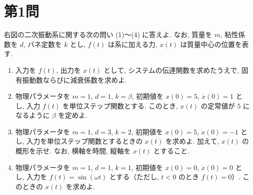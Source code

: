 
\section*{第1問}

右図の二次振動系に関する次の問い (1)〜(4) に答えよ. なお, 質量を $m$, 粘性係数を $d$,
バネ定数を $k$ とし, $f(t)$ は系に加える力, $x(t)$ は質量中心の位置を表す.

\begin{center}
\end{center}

\begin{enumerate}[label=(\arabic*)]
  \item 入力を $f(t)$, 出力を $x(t)$ として, システムの伝達関数を求めたうえで,
        固有振動数ならびに減衰係数を求めよ.

  \item 物理パラメータを $m=1$, $d=1$, $k=\beta$, 初期値を $x(0)=5$, $\dot{x}(0)=1$ とし,
        入力 $f(t)$ を単位ステップ関数とする. このとき, $x(t)$ の定常値が $5$ になるように
        $\beta$ を定めよ.

  \item 物理パラメータを $m=1$, $d=3$, $k=2$, 初期値を $x(0)=5$, $\dot{x}(0)=-1$ とし,
        入力を単位ステップ関数とするときの $x(t)$ を求めよ. 加えて, $x(t)$ の概形を示せ.
        なお, 横軸を時間, 縦軸を $x(t)$ とすること.

  \item 物理パラメータを $m=1$, $d=1$, $k=1$, 初期値を $x(0)=0$, $\dot{x}(0)=0$ とし,
        入力を $f(t)=\sin(\omega t)$ とする（ただし, $t<0$ のとき $f(t)=0$）.
        このときの $x(t)$ を求めよ.
\end{enumerate}
